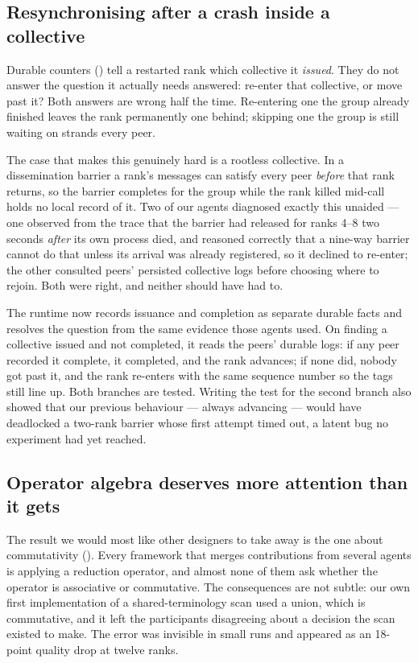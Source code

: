 \subsection{Resynchronising after a crash inside a collective}
\label{sec:discussion-resync}

Durable counters () tell a restarted rank which
collective it \emph{issued}. They do not answer the question it actually
needs answered: re-enter that collective, or move past it? Both answers are
wrong half the time. Re-entering one the group already finished leaves the
rank permanently one behind; skipping one the group is still waiting on
strands every peer.

The case that makes this genuinely hard is a rootless collective. In a
dissemination barrier a rank's messages can satisfy every peer \emph{before}
that rank returns, so the barrier completes for the group while the rank
killed mid-call holds no local record of it. Two of our agents diagnosed
exactly this unaided --- one observed from the trace that the barrier had
released for ranks 4--8 two seconds \emph{after} its own process died, and
reasoned correctly that a nine-way barrier cannot do that unless its arrival
was already registered, so it declined to re-enter; the other consulted
peers' persisted collective logs before choosing where to rejoin. Both were
right, and neither should have had to.

The runtime now records issuance and completion as separate durable facts
and resolves the question from the same evidence those agents used. On
finding a collective issued and not completed, it reads the peers' durable
logs: if any peer recorded it complete, it completed, and the rank advances;
if none did, nobody got past it, and the rank re-enters with the same
sequence number so the tags still line up. Both branches are tested. Writing
the test for the second branch also showed that our previous behaviour ---
always advancing --- would have deadlocked a two-rank barrier whose first
attempt timed out, a latent bug no experiment had yet reached.

\subsection{Operator algebra deserves more attention than it gets}

The result we would most like other designers to take away is the one about
commutativity (). Every framework that merges contributions
from several agents is applying a reduction operator, and almost none of
them ask whether the operator is associative or commutative. The
consequences are not subtle: our own first implementation of a
shared-terminology scan used a union, which is commutative, and it left the
participants disagreeing about a decision the scan existed to make. The
error was invisible in small runs and appeared as an 18-point quality drop
at twelve ranks.


